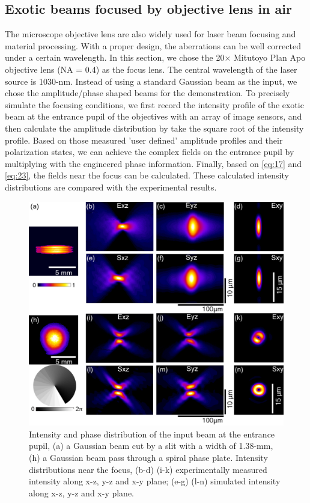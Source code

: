 \documentclass[9pt,twocolumn,twoside]{osajnl}
\begin{document}
\subsection{Exotic beams focused by objective lens in air}
The microscope objective lens are also widely used for laser beam focusing and material processing. With a proper design, the aberrations can be well corrected under a certain wavelength. In this section, we chose the 20$\times$ Mitutoyo Plan Apo objective lens (NA = 0.4) as the focus lens. The central wavelength of the laser source is 1030-nm. Instead of using a standard Gaussian beam as the input, we chose the amplitude/phase shaped beams for the demonstration. To precisely simulate the focusing conditions, we first record the intensity profile of the exotic beam at the entrance pupil of the objectives with an array of image sensors, and then calculate the amplitude distribution by take the square root of the intensity profile. Based on those measured 'user defined' amplitude profiles and their polarization states, we can achieve the complex fields on the entrance pupil by multiplying with the engineered phase information. Finally, based on \eqref{eq:17} and \eqref{eq:23}, the fields near the focus can be calculated. These calculated intensity distributions are compared with the experimental results. 

\begin{figure}
	\centering
	\includegraphics[width=\linewidth]{../AppOptics/figures/20xairExotic.pdf}
	\caption{Intensity and phase distribution of the input beam at the entrance pupil, (a) a Gaussian beam cut by a slit with a width of 1.38-mm, (h) a Gaussian beam pass through a spiral phase plate. Intensity distributions near the focus, (b-d) (i-k) experimentally measured intensity along x-z, y-z and x-y plane; (e-g) (l-n) simulated intensity along x-z, y-z and x-y plane.}\label{fig:4}
\end{figure}
\end{document}
